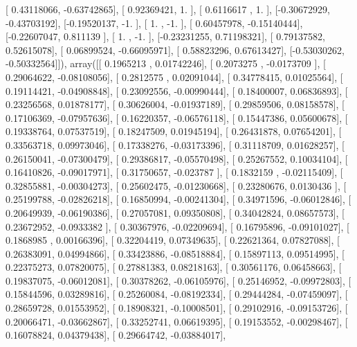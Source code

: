\documentclass{article}
\begin{document}
       [ 0.43118066, -0.63742865],
       [ 0.92369421,  1.        ],
       [ 0.6116617 ,  1.        ],
       [-0.30672929, -0.43703192],
       [-0.19520137, -1.        ],
       [ 1.        , -1.        ],
       [ 0.60457978, -0.15140444],
       [-0.22607047,  0.811139  ],
       [ 1.        , -1.        ],
       [-0.23231255,  0.71198321],
       [ 0.79137582,  0.52615078],
       [ 0.06899524, -0.66095971],
       [ 0.58823296,  0.67613427],
       [-0.53030262, -0.50332564]]), array([[ 0.1965213 ,  0.01742246],
       [ 0.2073275 , -0.0173709 ],
       [ 0.29064622, -0.08108056],
       [ 0.2812575 ,  0.02091044],
       [ 0.34778415,  0.01025564],
       [ 0.19114421, -0.04908848],
       [ 0.23092556, -0.00990444],
       [ 0.18400007,  0.06836893],
       [ 0.23256568,  0.01878177],
       [ 0.30626004, -0.01937189],
       [ 0.29859506,  0.08158578],
       [ 0.17106369, -0.07957636],
       [ 0.16220357, -0.06576118],
       [ 0.15447386,  0.05600678],
       [ 0.19338764,  0.07537519],
       [ 0.18247509,  0.01945194],
       [ 0.26431878,  0.07654201],
       [ 0.33563718,  0.09973046],
       [ 0.17338276, -0.03173396],
       [ 0.31118709,  0.01628257],
       [ 0.26150041, -0.07300479],
       [ 0.29386817, -0.05570498],
       [ 0.25267552,  0.10034104],
       [ 0.16410826, -0.09017971],
       [ 0.31750657, -0.023787  ],
       [ 0.1832159 , -0.02115409],
       [ 0.32855881, -0.00304273],
       [ 0.25602475, -0.01230668],
       [ 0.23280676,  0.0130436 ],
       [ 0.25199788, -0.02826218],
       [ 0.16850994, -0.00241304],
       [ 0.34971596, -0.06012846],
       [ 0.20649939, -0.06190386],
       [ 0.27057081,  0.09350808],
       [ 0.34042824,  0.08657573],
       [ 0.23672952, -0.0933382 ],
       [ 0.30367976, -0.02209694],
       [ 0.16795896, -0.09101027],
       [ 0.1868985 ,  0.00166396],
       [ 0.32204419,  0.07349635],
       [ 0.22621364,  0.07827088],
       [ 0.26383091,  0.04994866],
       [ 0.33423886, -0.08518884],
       [ 0.15897113,  0.09514995],
       [ 0.22375273,  0.07820075],
       [ 0.27881383,  0.08218163],
       [ 0.30561176,  0.06458663],
       [ 0.19837075, -0.06012081],
       [ 0.30378262, -0.06105976],
       [ 0.25146952, -0.09972803],
       [ 0.15844596,  0.03289816],
       [ 0.25260084, -0.08192334],
       [ 0.29444284, -0.07459097],
       [ 0.28659728,  0.01553952],
       [ 0.18908321, -0.10008501],
       [ 0.29102916, -0.09153726],
       [ 0.20066471, -0.03662867],
       [ 0.33252741,  0.06619395],
       [ 0.19153552, -0.00298467],
       [ 0.16078824,  0.04379438],
       [ 0.29664742, -0.03884017],
\end{document}

